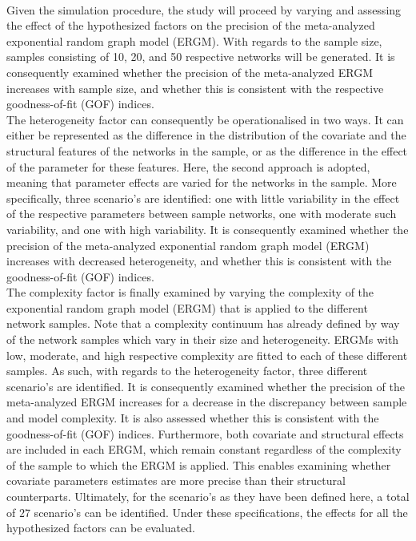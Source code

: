 \documentclass[a4paper, man]{apa6}
\begin{document}
\\ 
\clearpage Given the simulation procedure, the study will proceed by varying and assessing the effect of the hypothesized factors on the precision of the meta-analyzed exponential random graph model (ERGM). With regards to the sample size, samples consisting of 10, 20, and 50 respective networks will be generated.  It is consequently examined whether the precision of the meta-analyzed ERGM increases with sample size, and whether this is consistent with the respective goodness-of-fit (GOF) indices.
\\
The heterogeneity factor can consequently be operationalised in two ways. It can either be represented as the difference in the distribution of the covariate and the structural features of the networks in the sample, or as the difference in the effect of the parameter for these features. Here, the second approach is adopted, meaning that parameter effects are varied for the networks in the sample. More specifically, three scenario's are identified: one with little variability in the effect of the respective parameters between sample networks, one with moderate such variability, and one with high variability. It is consequently examined whether the precision of the meta-analyzed exponential random graph model (ERGM) increases with decreased heterogeneity, and whether this is consistent with the goodness-of-fit (GOF) indices. 
\\
The complexity factor is finally examined by varying the complexity of the exponential random graph model (ERGM) that is applied to the different network samples. Note that a complexity continuum has already defined by way of the network samples which vary in their size and heterogeneity. ERGMs with low, moderate, and high respective complexity are fitted to each of these different samples. As such, with regards to the heterogeneity factor, three different scenario's are identified. It is consequently examined whether the precision of the meta-analyzed ERGM increases for a decrease in the discrepancy between sample and model complexity. It is also assessed whether this is consistent with the goodness-of-fit (GOF) indices. Furthermore, both covariate and structural effects are included in each ERGM, which remain constant regardless of the complexity of the sample to which the ERGM is applied. This enables examining whether covariate parameters estimates are more precise than their structural counterparts. \clearpage \noindent Ultimately, for the scenario's as they have been defined here, a total of $27$  scenario's can be identified. Under these specifications, the effects for all the hypothesized factors can be evaluated.



\end{document}
